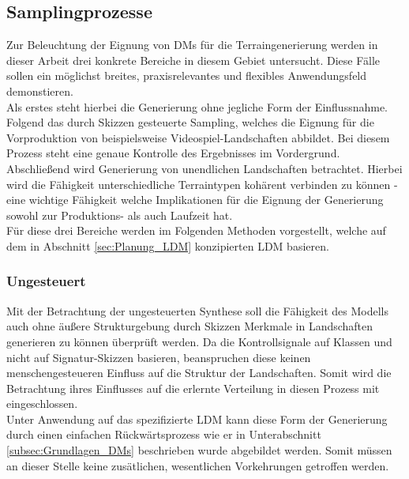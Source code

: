 \subsection {Samplingprozesse}

Zur Beleuchtung der Eignung von DMs für die Terraingenerierung werden in dieser Arbeit drei konkrete Bereiche in diesem Gebiet untersucht. Diese Fälle sollen ein möglichst breites, praxisrelevantes und flexibles Anwendungsfeld demonstieren.\\
Als erstes steht hierbei die Generierung ohne jegliche Form der Einflussnahme. \\
Folgend das durch Skizzen gesteuerte Sampling, welches die Eignung für die Vorproduktion von beispielsweise Videospiel-Landschaften abbildet. Bei diesem Prozess steht eine genaue Kontrolle des Ergebnisses im Vordergrund. \\
Abschließend wird Generierung von unendlichen Landschaften betrachtet. Hierbei wird die Fähigkeit unterschiedliche Terraintypen kohärent verbinden zu können - eine wichtige Fähigkeit welche Implikationen für die Eignung der Generierung sowohl zur Produktions- als auch Laufzeit hat. \\
Für diese drei Bereiche werden im Folgenden Methoden vorgestellt, welche auf dem in Abschnitt \ref{sec:Planung_LDM} konzipierten \ac{LDM} basieren. 


\subsubsection {Ungesteuert}

Mit der Betrachtung der ungesteuerten Synthese soll die Fähigkeit des Modells auch ohne äußere Strukturgebung durch Skizzen Merkmale in Landschaften generieren zu können überprüft werden. Da die Kontrollsignale auf Klassen und nicht auf Signatur-Skizzen basieren, beanspruchen diese keinen menschengesteueren Einfluss auf die Struktur der Landschaften. Somit wird die Betrachtung ihres Einflusses auf die erlernte Verteilung in diesen Prozess mit eingeschlossen. \\
Unter Anwendung auf das spezifizierte \ac{LDM} kann diese Form der Generierung durch einen einfachen Rückwärtsprozess wie er in Unterabschnitt \ref{subsec:Grundlagen_DMs} beschrieben wurde abgebildet werden. Somit müssen an dieser Stelle keine zusätlichen, wesentlichen Vorkehrungen getroffen werden. 

